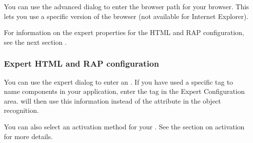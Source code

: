 You can use the advanced dialog to enter the browser path for your browser. This lets you use a specific version of the browser (not available for Internet Explorer). 

For information on the expert properties for the HTML and RAP \gdaut{} configuration, see the next section . 

\subsubsection{Expert HTML and RAP \gdaut{} configuration}
\label{ExpertAUTConfigHTML}

You can use the expert dialog to enter an  . If you have used a specific tag to name components in your application, enter the tag in the Expert Configuration area. \app{} will then use this information instead of the  attribute in the object recognition. 

You can also select an activation method for your \gdaut{}. See the section on \gdaut{} activation  for more details. 




